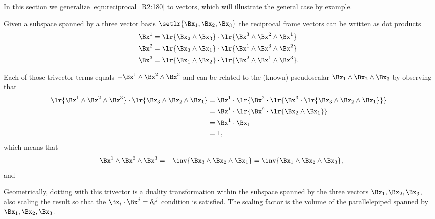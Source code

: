 %
%

In this section we generalize \cref{eqn:reciprocal_R2:180} to  vectors, which will illustrate the general case by example.

Given
a subspace spanned by a three vector basis \( \setlr{ \Bx_1, \Bx_2, \Bx_3 } \) the reciprocal frame vectors can be written as dot products
\begin{equation}\label{eqn:reciprocal_R3:320}
\begin{aligned}
\Bx^1 &= \lr{ \Bx_2 \wedge \Bx_3 } \cdot \lr{ \Bx^3 \wedge \Bx^2 \wedge \Bx^1 } \\
\Bx^2 &= \lr{ \Bx_3 \wedge \Bx_1 } \cdot \lr{ \Bx^1 \wedge \Bx^3 \wedge \Bx^2 } \\
\Bx^3 &= \lr{ \Bx_1 \wedge \Bx_2 } \cdot \lr{ \Bx^2 \wedge \Bx^1 \wedge \Bx^3 }.
\end{aligned}
\end{equation}

Each of those trivector terms equals \( - \Bx^1 \wedge \Bx^2 \wedge \Bx^3 \) and can be related to the (known) pseudoscalar \( \Bx_1 \wedge \Bx_2 \wedge \Bx_3 \) by observing that
\begin{equation}\label{eqn:reciprocal_R3:340}
\begin{aligned}
\lr{ \Bx^1 \wedge \Bx^2 \wedge \Bx^3 } \cdot \lr{ \Bx_3 \wedge \Bx_2 \wedge \Bx_1 }
&= \Bx^1 \cdot \lr{ \Bx^2 \cdot \lr{ \Bx^3 \cdot \lr{ \Bx_3 \wedge \Bx_2 \wedge \Bx_1 } }} \\
&= \Bx^1 \cdot \lr{ \Bx^2 \cdot \lr{ \Bx_2 \wedge \Bx_1 } } \\
&= \Bx^1 \cdot \Bx_1 \\
&= 1,
\end{aligned}
\end{equation}
which means that
\begin{dmath}\label{eqn:reciprocal_R3:360}
-\Bx^1 \wedge \Bx^2 \wedge \Bx^3
= -\inv{ \Bx_3 \wedge \Bx_2 \wedge \Bx_1 }
= \inv{ \Bx_1 \wedge \Bx_2 \wedge \Bx_3 },
\end{dmath}
and

Geometrically, dotting with this trivector is a duality transformation within the subspace spanned by the three vectors \( \Bx_1, \Bx_2, \Bx_3 \), also scaling the result so that the \( \Bx_i \cdot \Bx^j = {\delta_i}^j \) condition is satisfied.  The scaling factor is the volume of the parallelepiped spanned by \( \Bx_1, \Bx_2, \Bx_3 \).
